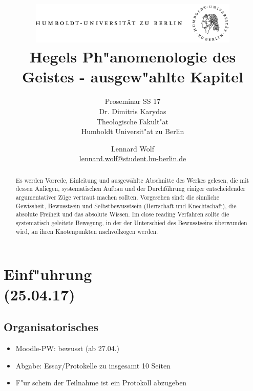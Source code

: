 \documentclass[emulatestandardclasses]{scrartcl}
\date{\vspace{-3ex}}
\begin{document}
\title{
	\includegraphics*[width=0.75\textwidth]{ErstesSem/images/hu_logo.png}\\
	\vspace{24pt}
	Hegels Ph"anomenologie des Geistes - ausgew"ahlte Kapitel}
\subtitle{Proseminar SS 17\\
          Dr. Dimitris Karydas\\
          Theologische Fakult"at \\ 
          Humboldt Universit"at zu Berlin}
\author{Lennard Wolf\\
        \small{\href{mailto:lennard.wolf@student.hu-berlin.de}{lennard.wolf@student.hu-berlin.de}}}
\maketitle
\begin{abstract}

Es werden Vorrede, Einleitung und ausgewählte Abschnitte des Werkes gelesen, die mit dessen Anliegen, systematischen Aufbau und der Durchführung einiger entscheidender argumentativer Züge vertraut machen sollten. Vorgesehen sind: die sinnliche Gewissheit, Bewusstsein und Selbstbewusstsein (Herrschaft und Knechtschaft), die absolute Freiheit und das absolute Wissen. Im close reading Verfahren sollte die systematisch geleitete Bewegung, in der der Unterschied des Bewusstseins überwunden wird, an ihren Knotenpunkten nachvollzogen werden.
\end{abstract}
\newpage

\tableofcontents
\listoffigures
\newpage


\section{Einf"uhrung\\(25.04.17)}

\subsection{Organisatorisches}

\begin{itemize}
  \item Moodle-PW: bewusst (ab 27.04.)
  \item Abgabe: Essay/Protokelle zu insgesamt 10 Seiten
  \item F"ur schein der Teilnahme ist ein Protokoll abzugeben
\end{itemize}
\end{document}
